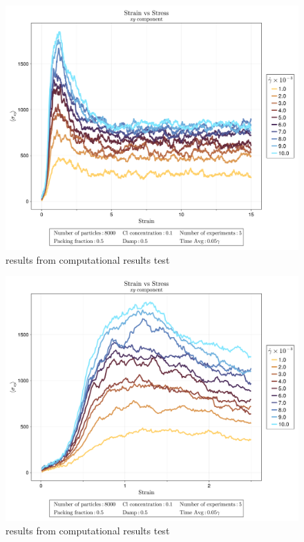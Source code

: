 \begin{figure}[ht!]
    \centering
    \includegraphics[width=\textwidth]{figs/ComputaitonalResults/CL10/StrainStressXY.png}
    \caption{results from computational results test}
\end{figure}

\begin{figure}[ht!]
    \centering
    \includegraphics[width=\textwidth]{figs/ComputaitonalResults/CL10/SmallStrainStressXY.png}
    \caption{results from computational results test}
\end{figure}

